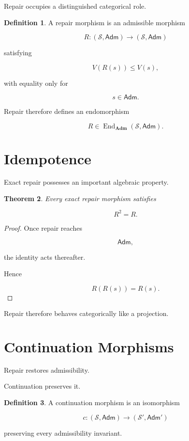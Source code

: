 \documentclass[11pt,oneside]{book}
\numberwithin{equation}{chapter}
\theoremstyle{definition}
\newtheorem{definition}{Definition}[chapter]
\theoremstyle{plain}
\newtheorem{theorem}[definition]{Theorem}
\DeclareMathOperator{\End}{End}
\newcommand{\State}{\mathcal{S}}
\newcommand{\Adm}{\mathsf{Adm}}
\begin{document}
Repair occupies a distinguished categorical role.

\begin{definition}

A repair morphism is an admissible morphism

\[
R:
(\State,\Adm)
\rightarrow
(\State,\Adm)
\]

satisfying

\[
V(R(s))
\le
V(s),
\]

with equality only for

\[
s
\in
\Adm.
\]

\end{definition}

Repair therefore defines an endomorphism

\[
R
\in
\End_{\mathbf{Adm}}(\State,\Adm).
\]

\section{Idempotence}

Exact repair possesses an important algebraic property.

\begin{theorem}

Every exact repair morphism satisfies

\[
R^2=R.
\]

\end{theorem}

\begin{proof}

Once repair reaches

\[
\Adm,
\]

the identity acts thereafter.

Hence

\[
R(R(s))
=
R(s).
\]

\end{proof}

Repair therefore behaves categorically like a projection.

\section{Continuation Morphisms}

Repair restores admissibility.

Continuation preserves it.

\begin{definition}

A continuation morphism is an isomorphism

\[
c:
(\State,\Adm)
\rightarrow
(\State',\Adm')
\]

preserving every admissibility invariant.

\end{definition}
\end{document}
